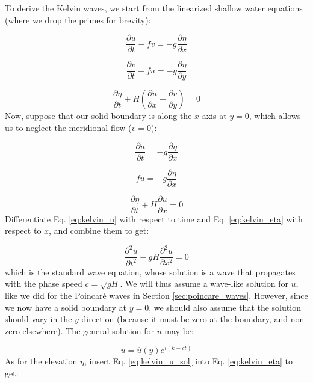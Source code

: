 \documentclass[12pt]{article}
\numberwithin{equation}{section}
\numberwithin{figure}{section}
\numberwithin{table}{section}
\begin{document}
To derive the Kelvin waves, we start from the linearized shallow water equations
(where we drop the primes for brevity):

\begin{equation}
  \frac{\partial u}{\partial t} - f v = - g \frac{\partial \eta}{\partial x}
\end{equation}

\begin{equation}
  \frac{\partial v}{\partial t} + f u = - g \frac{\partial \eta}{\partial y}
\end{equation}

\begin{equation}
  \frac{\partial \eta}{\partial t} + H \left( \frac{\partial u}{\partial x} + \frac{\partial v}{\partial y} \right) = 0
\end{equation}
Now, suppose that our solid boundary is along the $x$-axis at $y = 0$, which
allows us to neglect the meridional flow ($v=0$):

\begin{equation}
  \frac{\partial u}{\partial t} = - g \frac{\partial \eta}{\partial x}
  \label{eq:kelvin_u}
\end{equation}

\begin{equation}
  f u = - g \frac{\partial \eta}{\partial x}
  \label{eq:kelvin_v}
\end{equation}

\begin{equation}
  \frac{\partial \eta}{\partial t} + H \frac{\partial u}{\partial x} = 0
  \label{eq:kelvin_eta}
\end{equation}
Differentiate Eq. \ref{eq:kelvin_u} with respect to time and Eq. \ref{eq:kelvin_eta}
with respect to $x$, and combine them to get:

\begin{equation}
  \frac{\partial^2 u}{\partial t^2} - gH \frac{\partial^2 u}{\partial x^2} = 0
\end{equation}
which is the standard wave equation, whose solution is a wave that propagates
with the phase speed $c = \sqrt{gH}$.
We will thus assume a wave-like solution for $u$, like we did for the Poincaré
waves in Section \ref{sec:poincare_waves}.
However, since we now have a solid boundary at $y = 0$, we should also assume
that the solution should vary in the $y$ direction (because it must be zero
at the boundary, and non-zero elsewhere).
The general solution for $u$ may be:

\begin{equation}
  u = \widehat{u}(y) e^{i(k - c t)}
  \label{eq:kelvin_u_sol}
\end{equation}
As for the elevation $\eta$, insert Eq. \ref{eq:kelvin_u_sol} into Eq.
\ref{eq:kelvin_eta} to get:
\end{document}
